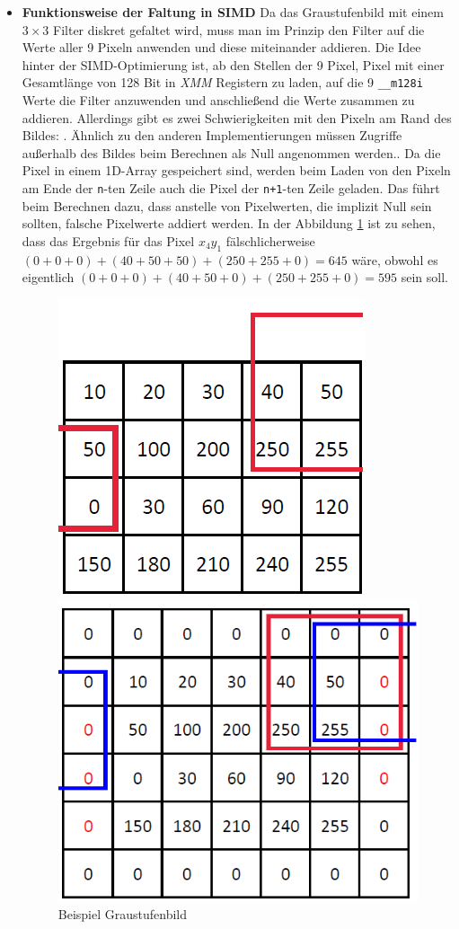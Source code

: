 \documentclass[course=erap]{aspdoc}
\begin{document}
\begin{itemize}
\item \textbf{Funktionsweise der Faltung in SIMD}\newline
Da das Graustufenbild mit einem $3\times3$ Filter diskret gefaltet wird, muss man im Prinzip den Filter auf die Werte aller 9 Pixeln anwenden und diese miteinander addieren. Die Idee hinter der SIMD-Optimierung ist, ab den Stellen der 9 Pixel, Pixel mit einer Gesamtlänge von 128 Bit in \textit{XMM} Registern zu laden, auf die 9 \texttt{\_\_m128i} Werte die Filter anzuwenden und anschließend die Werte zusammen zu addieren. Allerdings gibt es zwei Schwierigkeiten mit den Pixeln am Rand des Bildes: . Ähnlich zu den anderen Implementierungen müssen Zugriffe außerhalb des Bildes beim Berechnen als Null angenommen werden.. Da die Pixel in einem 1D-Array gespeichert sind, werden beim Laden von den Pixeln am Ende der \texttt{n}-ten Zeile auch die Pixel der \texttt{n+1}-ten Zeile geladen. Das führt beim Berechnen dazu, dass anstelle von Pixelwerten, die implizit Null sein sollten, falsche Pixelwerte addiert werden. In der Abbildung \ref{fig:beispiel_matrix} ist zu sehen, dass das Ergebnis für das Pixel $x_4y_1$  fälschlicherweise $(0+0+0)+(40+50+50)+(250+255+0) = 645$ wäre, obwohl es eigentlich $(0+0+0)+(40+50+0)+(250+255+0) = 595$ sein soll.
\begin{figure}[!ht]
    \begin{minipage}[t]{.5\linewidth}
    \centering
    \includegraphics[width=.5\linewidth]{Image/Faltung/Faltung_original.png}
    \caption{Beispiel Graustufenbild}
    \label{fig:beispiel_matrix}     
    \end{minipage}
    \begin{minipage}[t]{.5\linewidth}
    \centering
    \includegraphics[width=.5\linewidth]{Image/Faltung/Faltung_padded.png}

\end{minipage}
\end{figure}
\end{itemize}
\end{document}
